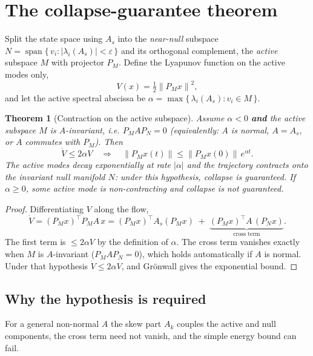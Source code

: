 \documentclass[11pt]{article}
\newtheorem{theorem}{Theorem}
\theoremstyle{definition}
\newcommand{\norm}[1]{\left\lVert#1\right\rVert}
\newcommand{\PM}{P_{\!M}}
\newcommand{\PN}{P_{\!N}}
\begin{document}
\section{The collapse-guarantee theorem}
Split the state space using $A_s$ into the \emph{near-null} subspace
$N = \operatorname{span}\{\, v_i : |\lambda_i(A_s)| < \varepsilon \,\}$ and its
orthogonal complement, the \emph{active} subspace $M$ with projector $\PM$. Define
the Lyapunov function on the active modes only,
\begin{equation}
V(x) = \tfrac12 \norm{\PM x}^2,
\end{equation}
and let the active spectral abscissa be
$\alpha = \max\{\, \lambda_i(A_s) : v_i \in M \,\}$.

\begin{theorem}[Contraction on the active subspace]
Assume $\alpha < 0$ \textbf{and} the active subspace $M$ is $A$-invariant, i.e.
$\PM A \PN = 0$ (equivalently: $A$ is normal, $A=A_s$, or $A$ commutes with $\PM$).
Then
\begin{equation}
\dot V \le 2\alpha V
\quad\Longrightarrow\quad
\norm{\PM x(t)} \le \norm{\PM x(0)}\, e^{\alpha t}.
\end{equation}
The active modes decay exponentially at rate $|\alpha|$ and the trajectory
contracts onto the invariant null manifold $N$: under this hypothesis, collapse is
guaranteed. If $\alpha \ge 0$, some active mode is non-contracting and collapse is
not guaranteed.
\end{theorem}

\begin{proof}
Differentiating $V$ along the flow,
\[
\dot V = (\PM x)^{\top}\PM A\,x
= (\PM x)^{\top} A_s (\PM x)
\;+\; \underbrace{(\PM x)^{\top} A\,(\PN x)}_{\text{cross term}}.
\]
The first term is $\le 2\alpha V$ by the definition of $\alpha$. The cross term
vanishes exactly when $M$ is $A$-invariant ($\PM A \PN = 0$), which holds
automatically if $A$ is normal. Under that hypothesis $\dot V \le 2\alpha V$, and
Gr\"onwall gives the exponential bound.
\end{proof}

\subsection{Why the hypothesis is required}
\label{sec:hypothesis}
For a general non-normal $A$ the skew part $A_k$ couples the active and null
components, the cross term need not vanish, and the simple energy bound can fail.
\end{document}
